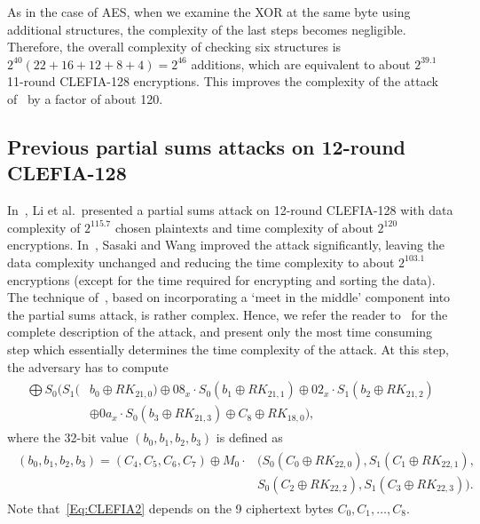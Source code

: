 As in the case of AES, when we examine the XOR at the same byte using additional structures, the complexity of the last steps becomes negligible. Therefore, the overall complexity of checking six structures is $2^{40}(22+16+12+8+4)=2^{46}$ additions, which are equivalent to about $2^{39.1}$ 11-round CLEFIA-128 encryptions. This improves the complexity of the attack of~\cite{SAC:SasWan12} by a factor of about 120.

\subsection{Previous partial sums attacks on 12-round CLEFIA-128}

In~\cite{WISA:LiWuZha11}, Li et al.~presented a partial sums attack on 12-round CLEFIA-128 with data complexity of $2^{115.7}$ chosen plaintexts and time complexity of about $2^{120}$ encryptions. In~\cite{SAC:SasWan12}, Sasaki and Wang improved the attack significantly, leaving the data complexity unchanged and reducing the time complexity to about $2^{103.1}$ encryptions (except for the time required for encrypting and sorting the data). The technique of~\cite{SAC:SasWan12}, based on incorporating a `meet in the middle' component into the partial sums attack, is rather complex. Hence, we refer the reader to~\cite{SAC:SasWan12} for the complete description of the attack, and present only the most time consuming step which essentially determines the time complexity of the attack. At this step, the adversary has to compute    
\begin{align}\label{Eq:CLEFIA2}
  \begin{split}
\bigoplus S_0(S_1(&b_0 \oplus RK_{21,0}) \oplus 08_x \cdot S_0(b_1 \oplus RK_{21,1}) \oplus 02_x \cdot S_1(b_2 \oplus RK_{21,2}) \\ &\oplus 0a_x \cdot S_0(b_3 \oplus RK_{21,3}) \oplus C_{8} \oplus RK_{18,0}),
  \end{split}  
\end{align}
where the 32-bit value $(b_0,b_1,b_2,b_3)$ is defined as 
\begin{align}\label{Eq:CLEFIA3}
  \begin{split}
(b_0,b_1,b_2,b_3)=(C_4,C_5,C_6,C_7) \oplus M_0 \cdot& (S_0(C_0 \oplus RK_{22,0}), S_1(C_1 \oplus RK_{22,1}),\\ 
&S_0(C_2 \oplus RK_{22,2}), S_1(C_3 \oplus RK_{22,3})).
  \end{split}  
\end{align}
Note that~\eqref{Eq:CLEFIA2} depends on the 9 ciphertext bytes $C_0,C_1,\ldots,C_8$.
